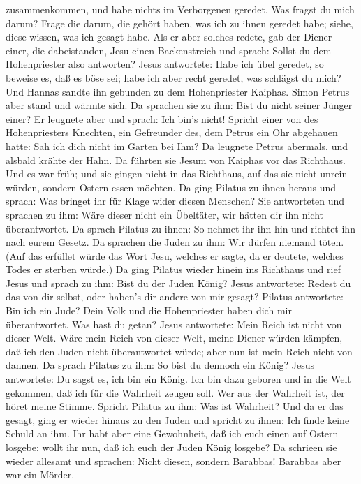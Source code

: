 zusammenkommen, und habe nichts im Verborgenen geredet. 
Was fragst du mich darum? Frage die darum, die gehört haben, was ich zu
ihnen geredet habe; siehe, diese wissen, was ich gesagt habe.
 Als er aber solches redete, gab der Diener einer, die
dabeistanden, Jesu einen Backenstreich und sprach: Sollst du dem
Hohenpriester also antworten?  Jesus antwortete: Habe ich
übel geredet, so beweise es, daß es böse sei; habe ich aber recht
geredet, was schlägst du mich?  Und Hannas sandte ihn
gebunden zu dem Hohenpriester Kaiphas.  Simon Petrus aber
stand und wärmte sich. Da sprachen sie zu ihm: Bist du nicht seiner
Jünger einer? Er leugnete aber und sprach: Ich bin's nicht!
 Spricht einer von des Hohenpriesters Knechten, ein
Gefreunder des, dem Petrus ein Ohr abgehauen hatte: Sah ich dich nicht
im Garten bei Ihm?  Da leugnete Petrus abermals, und
alsbald krähte der Hahn.  Da führten sie Jesum von Kaiphas
vor das Richthaus. Und es war früh; und sie gingen nicht in das
Richthaus, auf das sie nicht unrein würden, sondern Ostern essen
möchten.  Da ging Pilatus zu ihnen heraus und sprach: Was
bringet ihr für Klage wider diesen Menschen?  Sie
antworteten und sprachen zu ihm: Wäre dieser nicht ein Übeltäter, wir
hätten dir ihn nicht überantwortet.  Da sprach Pilatus zu
ihnen: So nehmet ihr ihn hin und richtet ihn nach eurem Gesetz. Da
sprachen die Juden zu ihm: Wir dürfen niemand töten.  (Auf
das erfüllet würde das Wort Jesu, welches er sagte, da er deutete,
welches Todes er sterben würde.)  Da ging Pilatus wieder
hinein ins Richthaus und rief Jesus und sprach zu ihm: Bist du der Juden
König?  Jesus antwortete: Redest du das von dir selbst,
oder haben's dir andere von mir gesagt?  Pilatus
antwortete: Bin ich ein Jude? Dein Volk und die Hohenpriester haben dich
mir überantwortet. Was hast du getan?  Jesus antwortete:
Mein Reich ist nicht von dieser Welt. Wäre mein Reich von dieser Welt,
meine Diener würden kämpfen, daß ich den Juden nicht überantwortet
würde; aber nun ist mein Reich nicht von dannen.  Da sprach
Pilatus zu ihm: So bist du dennoch ein König? Jesus antwortete: Du sagst
es, ich bin ein König. Ich bin dazu geboren und in die Welt gekommen,
daß ich für die Wahrheit zeugen soll. Wer aus der Wahrheit ist, der
höret meine Stimme.  Spricht Pilatus zu ihm: Was ist
Wahrheit? Und da er das gesagt, ging er wieder hinaus zu den Juden und
spricht zu ihnen: Ich finde keine Schuld an ihm.  Ihr habt
aber eine Gewohnheit, daß ich euch einen auf Ostern losgebe; wollt ihr
nun, daß ich euch der Juden König losgebe?  Da schrieen sie
wieder allesamt und sprachen: Nicht diesen, sondern Barabbas! Barabbas
aber war ein Mörder.

